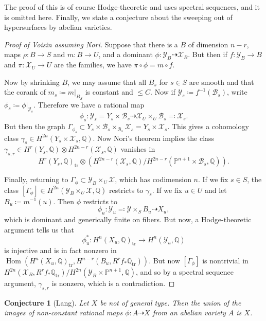\documentclass[leqno, openany]{memoir}
\newtheorem{conj}[thm]{Conjecture}
\theoremstyle{definition}
\theoremstyle{remark}
\theoremstyle{plain}
\theoremstyle{definition}
\theoremstyle{remark}
\newcommand{\Q}{\mathbb{Q}}
\renewcommand{\P}{\mathbb{P}}
\newcommand{\mc}[1]{\mathcal{#1}}
\newcommand{\mr}[1]{\mathrm{#1}}
\DeclareMathOperator{\Hom}{Hom}
\begin{document}
The proof of this is of course Hodge-theoretic and uses spectral sequences, and it is omitted here. Finally, we state a conjecture about the sweeping out of hypersurfaces by abelian varieties.

\begin{proof}[Proof of Voisin assuming Nori]
    Suppose that there is a $B$ of dimension $n-r$, maps $\rho \colon B \to S$ and $m \colon B \to U$, and a dominant $\phi \colon \mc{Y}_B \dashrightarrow \mc{X}_B$. But then if $f \colon \mc{Y}_B \to B$ and $\pi \colon \mc{X}_U \to U$ are the families, we have $\pi \circ \phi = m \circ f$.

    Now by shrinking $B$, we may assume that all $B_s$ for $s \in S$ are smooth and that the corank of $m_s \coloneqq m |_{B_S}$ is constant and $\leq C$. Now if $\mc{Y}_s \coloneqq f^{-1}(\mc{B}_s)$, write $\phi_s \coloneqq \phi |_{\mc{Y}_s}$. Therefore we have a rational map
    \[ \phi_s \colon \mc{Y}_s = Y_s \times \mc{B}_s \dashrightarrow \mc{X}_U \times_U \mc{B}_s \eqqcolon \mc{X}_s. \]
    But then the graph $\Gamma_{\phi_s} \subset Y_s \times \mc{B}_s \times_{\mc{B}_s} \mc{X}_s = Y_s \times \mc{X}_s$. This gives a cohomology class $\gamma_s \in H^{2n}(Y_s \times \mc{X}_s, \Q)$. Now Nori's theorem implies the class $\gamma_{s, r} \in H^r(Y_s, \Q) \otimes H^{2n-r}(\mc{X}_s, \Q)$ vanishes in 
    \[ H^r(Y_s, \Q)_{\mr{tr}} \otimes (H^{2n-r}(\mc{X}_s, \Q) / H^{2n-r}(\P^{n+1} \times \mc{B}_s, \Q)). \]

    Finally, returning to $\Gamma_{\phi} \subset \mc{Y}_B \times_U \mc{X}$, which has codimension $n$. If we fix $s \in S$, the class $[\Gamma_{\phi}] \in H^{2n}(\mc{Y}_B \times_U \mc{X}, \Q)$ restricts to $\gamma_s$. If we fix $u \in U$ and let $B_u \coloneqq m^{-1}(u)$. Then $\phi$ restricts to
    \[ \phi_u \colon \mc{Y}_u \eqqcolon \mc{Y} \times_S B_u \dashrightarrow X_u, \]
    which is dominant and generically finite on fibers. But now, a Hodge-theoretic argument tells us that
    \[ \phi_u^* \colon H^n(X_u, \Q)_{\mr{tr}} \to H^n(\mc{Y}_u, \Q) \]
    is injective and is in fact nonzero in $\Hom(H^n(X_u, \Q)_{\mr{tr}}, H^{n-r}(B_u, R^r f_* \Q_{\mr{tr}}))$. But now $[\Gamma_{\phi}]$ is nontrivial in $H^{2n}(\mc{X}_B, R^r f_* \Q_{\mr{tr}}) / H^{2n}(\mc{Y}_B \times \P^{n+1}, \Q)$, and so by a spectral sequence argument, $\gamma_{s,r}$ is nonzero, which is a contradiction.
\end{proof}

\begin{conj}[Lang]
    Let $X$ be not of general type. Then the union of the images of non-constant rational maps $\phi \colon A \dashrightarrow X$ from an abelian variety $A$ is $X$.
\end{conj}
\end{document}
